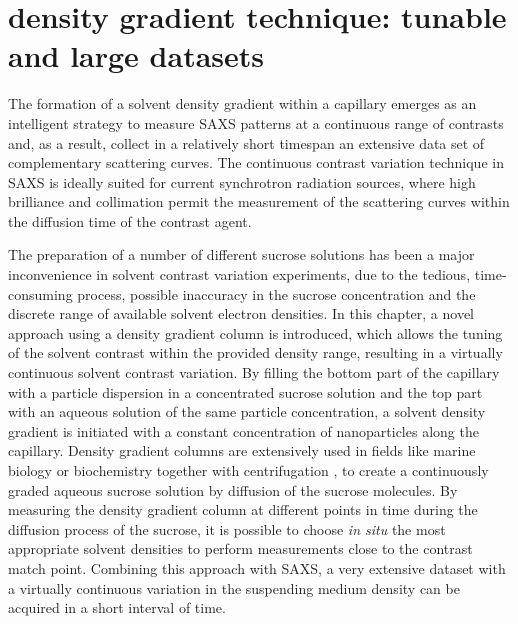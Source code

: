 \section{density gradient technique: tunable and large datasets}

The formation of a solvent density gradient within a capillary emerges as an intelligent strategy to measure SAXS patterns at a continuous range of contrasts and, as a result, collect in a relatively short timespan an extensive data set of complementary scattering curves\citep{garcia-diez_nanoparticle_2015}. The continuous contrast variation technique in SAXS is ideally suited for current synchrotron radiation sources, where high brilliance and collimation permit the measurement of the scattering curves within the diffusion time of the contrast agent.

The preparation of a number of different sucrose solutions has been a major inconvenience in solvent contrast variation experiments, due to the tedious, time-consuming process, possible inaccuracy in the sucrose concentration and the discrete range of available solvent electron densities. In this chapter, a novel approach using a density gradient column is introduced, which allows the tuning of the solvent contrast within the provided density range, resulting in a virtually continuous solvent contrast variation. By filling the bottom part of the capillary with a particle dispersion in a concentrated sucrose solution and the top part with an aqueous solution of the same particle concentration, a solvent density gradient is initiated with a constant concentration of nanoparticles along the capillary. Density gradient columns are extensively used in fields like marine biology \citep{coombs_density-gradient_1981} or biochemistry together with centrifugation \citep{hinton_density_1978}, to create a continuously graded aqueous sucrose solution by diffusion of the sucrose molecules. By measuring the density gradient column at different points in time during the diffusion process of the sucrose, it is possible to choose \emph{in situ} the most appropriate solvent densities to perform measurements close to the contrast match point. Combining this approach with SAXS, a very extensive dataset with a virtually continuous variation in the suspending medium density can be acquired in a short interval of time.

